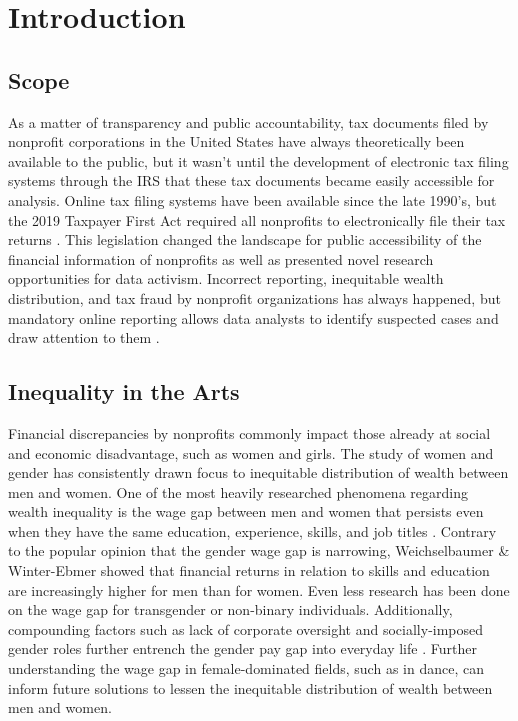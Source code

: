 \documentclass[Dance Data
Project,article,submit,moreauthors,pdftex]{mdpi}
\begin{document}

\hypertarget{introduction}{%
\section{Introduction}\label{introduction}}

\hypertarget{scope}{%
\subsection{Scope}\label{scope}}

As a matter of transparency and public accountability, tax documents
filed by nonprofit corporations in the United States have always
theoretically been available to the public, but it wasn't until the
development of electronic tax filing systems through the IRS that these
tax documents became easily accessible for analysis. Online tax filing
systems have been available since the late 1990's, but the 2019 Taxpayer
First Act required all nonprofits to electronically file their tax
returns \citep{ely_research_2023}. This legislation changed the
landscape for public accessibility of the financial information of
nonprofits as well as presented novel research opportunities for data
activism. Incorrect reporting, inequitable wealth distribution, and tax
fraud by nonprofit organizations has always happened, but mandatory
online reporting allows data analysts to identify suspected cases and
draw attention to them \citep{ely_research_2023}.

\hypertarget{inequality-in-the-arts}{%
\subsection{Inequality in the Arts}\label{inequality-in-the-arts}}

Financial discrepancies by nonprofits commonly impact those already at
social and economic disadvantage, such as women and girls. The study of
women and gender has consistently drawn focus to inequitable
distribution of wealth between men and women. One of the most heavily
researched phenomena regarding wealth inequality is the wage gap between
men and women that persists even when they have the same education,
experience, skills, and job titles \citep{jikar_gender_2022}. Contrary
to the popular opinion that the gender wage gap is narrowing,
Weichselbaumer \& Winter-Ebmer \citep{weichselbaumer_meta-analysis_2005}
showed that financial returns in relation to skills and education are
increasingly higher for men than for women. Even less research has been
done on the wage gap for transgender or non-binary individuals.
Additionally, compounding factors such as lack of corporate oversight
and socially-imposed gender roles further entrench the gender pay gap
into everyday life \citep{noauthor_handbook_2013}. Further understanding
the wage gap in female-dominated fields, such as in dance, can inform
future solutions to lessen the inequitable distribution of wealth
between men and women.
\end{document}
